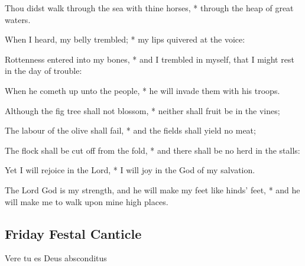 \begin{multicols}{2}
Thou didst walk through the sea with thine horses, * through the heap of great waters.\par
When I heard, my belly trembled; * my lips quivered at the voice:\par
Rottenness entered into my bones, * and I trembled in myself, that I might rest in the day of trouble:\par
When he cometh up unto the people, * he will invade them with his troops.\par
Although the fig tree shall not blossom, * neither shall fruit be in the vines;\par
The labour of the olive shall fail, * and the fields shall yield no meat;\par
The flock shall be cut off from the fold, * and there shall be no herd in the stalls:\par
Yet I will rejoice in the Lord, * I will joy in the God of my salvation.\par
The Lord God is my strength, and he will make my feet like hinds' feet, * and he will make me to walk upon mine high places.

\subsection{Friday Festal Canticle}

\begin{inhead}
Vere tu es Deus absconditus
\end{inhead}


\end{multicols}
